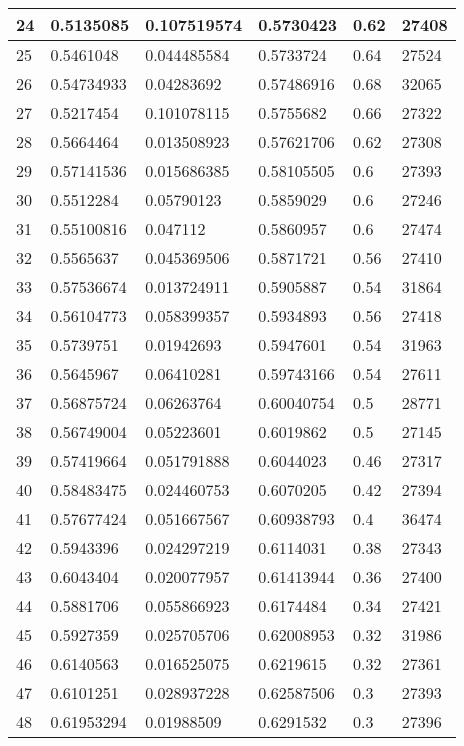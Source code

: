 \begin{longtable}{|l|l|l|l|l|l|}
24 & 0.5135085 & 0.107519574 & 0.5730423 & 0.62 & 27408 \\ \hline 
25 & 0.5461048 & 0.044485584 & 0.5733724 & 0.64 & 27524 \\ \hline 
26 & 0.54734933 & 0.04283692 & 0.57486916 & 0.68 & 32065 \\ \hline 
27 & 0.5217454 & 0.101078115 & 0.5755682 & 0.66 & 27322 \\ \hline 
28 & 0.5664464 & 0.013508923 & 0.57621706 & 0.62 & 27308 \\ \hline 
29 & 0.57141536 & 0.015686385 & 0.58105505 & 0.6 & 27393 \\ \hline 
30 & 0.5512284 & 0.05790123 & 0.5859029 & 0.6 & 27246 \\ \hline 
31 & 0.55100816 & 0.047112 & 0.5860957 & 0.6 & 27474 \\ \hline 
32 & 0.5565637 & 0.045369506 & 0.5871721 & 0.56 & 27410 \\ \hline 
33 & 0.57536674 & 0.013724911 & 0.5905887 & 0.54 & 31864 \\ \hline 
34 & 0.56104773 & 0.058399357 & 0.5934893 & 0.56 & 27418 \\ \hline 
35 & 0.5739751 & 0.01942693 & 0.5947601 & 0.54 & 31963 \\ \hline 
36 & 0.5645967 & 0.06410281 & 0.59743166 & 0.54 & 27611 \\ \hline 
37 & 0.56875724 & 0.06263764 & 0.60040754 & 0.5 & 28771 \\ \hline 
38 & 0.56749004 & 0.05223601 & 0.6019862 & 0.5 & 27145 \\ \hline 
39 & 0.57419664 & 0.051791888 & 0.6044023 & 0.46 & 27317 \\ \hline 
40 & 0.58483475 & 0.024460753 & 0.6070205 & 0.42 & 27394 \\ \hline 
41 & 0.57677424 & 0.051667567 & 0.60938793 & 0.4 & 36474 \\ \hline 
42 & 0.5943396 & 0.024297219 & 0.6114031 & 0.38 & 27343 \\ \hline 
43 & 0.6043404 & 0.020077957 & 0.61413944 & 0.36 & 27400 \\ \hline 
44 & 0.5881706 & 0.055866923 & 0.6174484 & 0.34 & 27421 \\ \hline 
45 & 0.5927359 & 0.025705706 & 0.62008953 & 0.32 & 31986 \\ \hline 
46 & 0.6140563 & 0.016525075 & 0.6219615 & 0.32 & 27361 \\ \hline 
47 & 0.6101251 & 0.028937228 & 0.62587506 & 0.3 & 27393 \\ \hline 
48 & 0.61953294 & 0.01988509 & 0.6291532 & 0.3 & 27396 \\ \hline 

\end{longtable}

